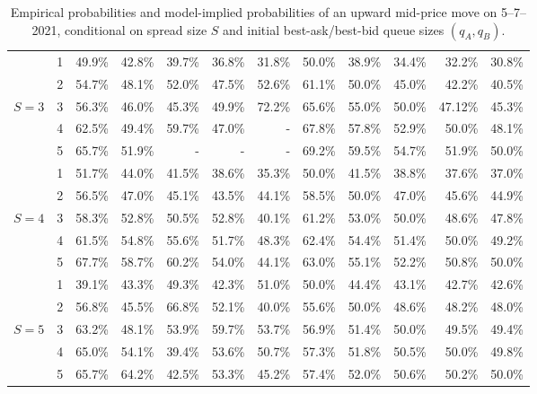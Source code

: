\documentclass[11pt]{article}
\begin{document}
{\begin{table}[!htbp]
\begin{adjustbox}{max width=\textwidth}
\begin{tabular}{c c r r r r r |r r r r r}
             & 1 & 49.9\% & 42.8\% & 39.7\% & 36.8\% & 31.8\% & 50.0\% & 38.9\% & 34.4\% & 32.2\% & 30.8\%\\
             & 2 & 54.7\% & 48.1\% & 52.0\% & 47.5\% & 52.6\% & 61.1\% & 50.0\% & 45.0\% & 42.2\% & 40.5\%\\
             $S=3$ & 3 & 56.3\% & 46.0\% & 45.3\% & 49.9\% & 72.2\% & 65.6\% & 55.0\% & 50.0\% & 47.12\% & 45.3\%\\
             & 4 & 62.5\% & 49.4\% & 59.7\% & 47.0\% & - & 67.8\% & 57.8\% & 52.9\% & 50.0\% & 48.1\%\\
             & 5 & 65.7\% & 51.9\% & - & - & - & 69.2\% & 59.5\% & 54.7\% & 51.9\% & 50.0\%\\ \midrule
             & 1 & 51.7\% & 44.0\% & 41.5\% & 38.6\% & 35.3\% & 50.0\% & 41.5\% & 38.8\% & 37.6\% & 37.0\%\\
             & 2 & 56.5\% & 47.0\% & 45.1\% & 43.5\% & 44.1\% & 58.5\% & 50.0\% & 47.0\% & 45.6\% & 44.9\%\\
             $S=4$ & 3 & 58.3\% & 52.8\% & 50.5\% & 52.8\% & 40.1\% & 61.2\% & 53.0\% & 50.0\% & 48.6\% & 47.8\%\\
             & 4 & 61.5\% & 54.8\% & 55.6\% & 51.7\% & 48.3\% & 62.4\% & 54.4\% & 51.4\% & 50.0\% & 49.2\%\\
             & 5 & 67.7\% & 58.7\% & 60.2\% & 54.0\% & 44.1\% & 63.0\% & 55.1\% & 52.2\% & 50.8\% & 50.0\%\\ \midrule
              & 1 & 39.1\% & 43.3\% & 49.3\% & 42.3\% & 51.0\% & 50.0\% & 44.4\% & 43.1\% & 42.7\% & 42.6\% \\
              & 2 & 56.8\% & 45.5\% & 66.8\% & 52.1\% & 40.0\% & 55.6\% & 50.0\% & 48.6\% & 48.2\% & 48.0\% \\
              $S=5 $& 3 & 63.2\% & 48.1\% & 53.9\% & 59.7\% & 53.7\% & 56.9\% & 51.4\% & 50.0\% & 49.5\% & 49.4\% \\
              & 4 & 65.0\% & 54.1\% & 39.4\% & 53.6\% & 50.7\% & 57.3\% & 51.8\% & 50.5\% & 50.0\% & 49.8\% \\
              & 5 & 65.7\% & 64.2\% & 42.5\% & 53.3\% & 45.2\% & 57.4\% & 52.0\% & 50.6\% & 50.2\% & 50.0\%\\
             \bottomrule
            \end{tabular}
        \end{adjustbox}
         \caption{Empirical probabilities and model-implied probabilities of an upward mid-price move on 5--7--2021, conditional on spread size $S$ and initial best-ask/best-bid queue sizes $(q_A,q_B)$.}
     \label{tab: prob_pricemove_week_before}  
\end{table}}
\end{document}
